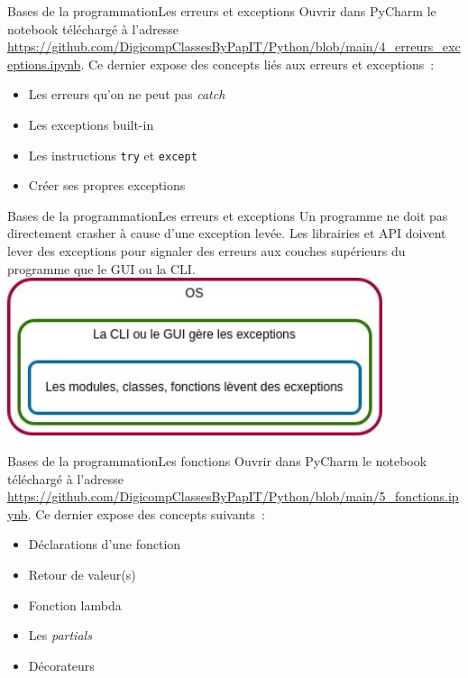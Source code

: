 \documentclass{beamer}
\begin{document}
    \begin{frame}{Bases de la programmation}{Les erreurs et exceptions}
        Ouvrir dans PyCharm le notebook téléchargé à l'adresse \url{https://github.com/DigicompClassesByPapIT/Python/blob/main/4_erreurs_exceptions.ipynb}.
        \bigbreak
        Ce dernier expose des concepts liés aux erreurs et exceptions~:
        \begin{itemize}
            \item Les erreurs qu'on ne peut pas \textit{catch}
            \item Les exceptions built-in
            \item Les instructions \lstinline{try} et \lstinline{except}
            \item Créer ses propres exceptions
        \end{itemize}
    \end{frame}

    \begin{frame}{Bases de la programmation}{Les erreurs et exceptions}
        Un programme ne doit pas directement crasher à cause d'une exception levée.
        Les librairies et API doivent lever des exceptions pour signaler des erreurs aux couches supérieurs du programme que le GUI ou la CLI.
        \bigbreak
        \centering
        \includegraphics[width=11cm]{image/exception}
    \end{frame}

    \begin{frame}{Bases de la programmation}{Les fonctions}
        Ouvrir dans PyCharm le notebook téléchargé à l'adresse \url{https://github.com/DigicompClassesByPapIT/Python/blob/main/5_fonctions.ipynb}.
        \bigbreak
        Ce dernier expose des concepts suivants~:
        \begin{itemize}
            \item Déclarations d'une fonction
            \item Retour de valeur(s)
            \item Fonction lambda
            \item Les \textit{partials}
            \item Décorateurs
        \end{itemize}
    \end{frame}
\end{document}
